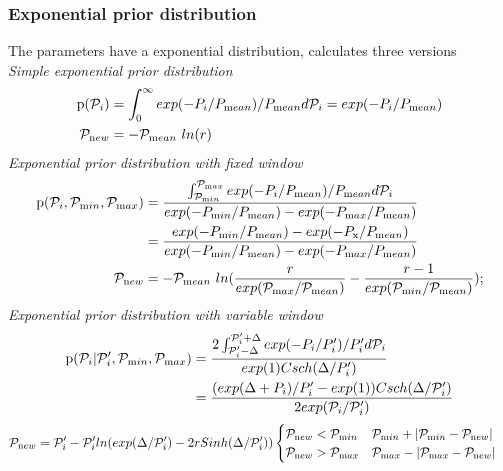 \subsubsection{Exponential prior distribution}
The parameters have a exponential distribution, \migrate calculates three versions\\
\textsl{Simple exponential prior distribution}
\begin{align}
\label{EXPPRIOR}
    \prob(\P_i) &=  \int_0^\infty exp( -P_{i} / P_{\mathrm mean}) / P_{\mathrm mean} d\P_i = exp(- P_{i}/P_{\mathrm mean}) \\
    \P_{\mathrm new} &=  - \P_{\mathrm mean}\ ln(r)
\end{align}
\textsl{Exponential prior distribution with fixed window}
\begin{align}
\label{WEXPPRIOR}
    \prob(\P_i, \P_{\mathrm min}, \P_{\mathrm max}) &=  \frac{\int_{\P_{\mathrm min}}^{\P_{\mathrm max}} exp( -P_{i} / P_{\mathrm mean}) / P_{\mathrm mean} d\P_i}{exp(-P_{\mathrm min}/P_{\mathrm mean}) - exp(-P_{\mathrm max}/P_{\mathrm mean})}\\ 
     &= \frac{exp(-P_{\mathrm min}/P_{\mathrm mean}) - exp(-P_{\mathrm x}/P_{\mathrm mean})}{exp(-P_{\mathrm min}/P_{\mathrm mean}) - exp(-P_{\mathrm max}/P_{\mathrm mean})} \\
    \P_{\mathrm new} &=  - \P_{\mathrm mean}\ ln(\frac{r}{exp(\P_{\mathrm max}/\P_{\mathrm mean})}-\frac{r-1}{exp(\P_{\mathrm min}/\P_{\mathrm mean})}); 
\end{align}
\textsl{Exponential prior distribution with variable window}
\begin{align}
\label{AEXPPRIOR}
    \prob(\P_i | \P'_i,  \P_{\mathrm min}, \P_{\mathrm max}) &=  \frac{2 \int_{\P'_i - \Delta}^{\P'_i + \Delta} exp( -P_{i} / P'_i) / P'_i d\P_i}{exp(1) Csch(\Delta / P'_i)}\\ 
     &= \frac{(exp(\Delta + P_i)/P'_i - exp(1)) Csch(\Delta/\P'_i)}{2 exp(\P_i/\P'_i)} 
     \end{align}
     \begin{align}
    \P_{\mathrm new} &=  \P'_i - \P'_i ln(exp(\Delta/\P'_i) - 2 r Sinh(\Delta / \P'_i))\begin{cases} \P_{\mathrm new} < \P_{\mathrm min}  &  \P_{\mathrm min} + |\P_{\mathrm min} - \P_{\mathrm new}| \\
     \P_{\mathrm new} > \P_{\mathrm max}  &  \P_{\mathrm max} - |\P_{\mathrm max} - \P_{\mathrm new}| \end{cases}
\end{align}
